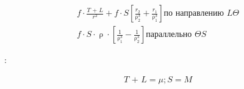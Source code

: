 \documentclass[a4paper,12pt]{article}
\begin{document}
\begin{equation*}
    \begin{aligned}
        f \cdot \frac{\textit{T + L}}{\textit{r}^2} + f \cdot \textit{S} \left[\frac{\textit{r}_2}{\uprho_2^3} + \frac{\textit{r}_1}{\uprho_1^3}\right] \text{по направлению } {\textit{L}}\Theta \\
        f \cdot \textit{S} \cdot \uprho \cdot \left[\frac{1}{\uprho_1^3} - \frac{1}{\uprho_2^3}\right]  \text{параллельно } \Theta{\textit{S}}
    \end{aligned}
\end{equation*}

:

\begin{equation*}
    \begin{aligned}
        \textit{T + L} = \mu; \textit{S} = \textit{M}
    \end{aligned}
\end{equation*}
\end{document}
